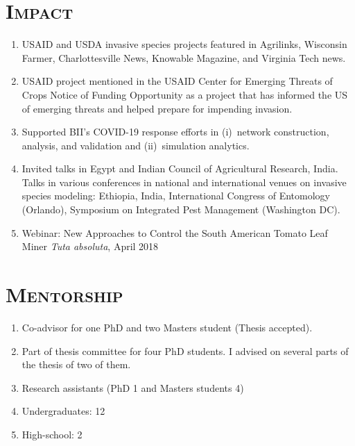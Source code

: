 \documentclass[margin,10pt]{res} %
\begin{document}
\begin{resume}
{\section{\textnormal{\textsc{Impact}}}
\begin{enumerate}[$\circ$]
\item USAID and USDA invasive species projects featured in Agrilinks,
Wisconsin Farmer, Charlottesville News, Knowable Magazine, and Virginia
Tech news.
\item USAID project mentioned in the USAID Center for Emerging Threats of
Crops Notice of Funding Opportunity as a project that has informed the US
of emerging threats and helped prepare for impending invasion.
\item Supported BII's COVID-19 response efforts in (i)~network construction,
analysis, and validation and (ii)~simulation analytics. 
\item Invited talks in Egypt and Indian Council of Agricultural Research,
India. Talks in various conferences in national and international venues on
invasive species modeling: Ethiopia, India, International Congress of
Entomology (Orlando), Symposium on Integrated Pest Management (Washington
DC).
\item Webinar: New Approaches to Control the South American Tomato Leaf
Miner \emph{Tuta absoluta}, April 2018
\end{enumerate}
}

\section{\textnormal{\textsc{Mentorship}}}
\begin{enumerate}[$\circ$]
    \item Co-advisor for one PhD and two Masters student (Thesis accepted).
    \item Part of thesis committee for four PhD students. I advised on
    several parts of the thesis of two of them.
    \item Research assistants (PhD 1 and Masters students 4)
    \item Undergraduates: 12
    \item High-school: 2
\end{enumerate}


\end{resume}
\end{document}
